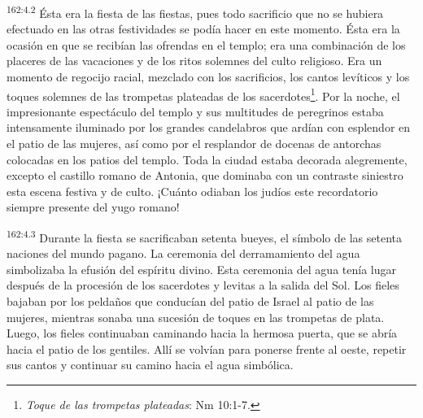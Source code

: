 \par
\textsuperscript{162:4.2} Ésta era la fiesta de las fiestas, pues todo sacrificio que no se hubiera efectuado en las otras festividades se podía hacer en este momento. Ésta era la ocasión en que se recibían las ofrendas en el templo; era una combinación de los placeres de las vacaciones y de los ritos solemnes del culto religioso. Era un momento de regocijo racial, mezclado con los sacrificios, los cantos levíticos y los toques solemnes de las trompetas plateadas de los sacerdotes\footnote{\textit{Toque de las trompetas plateadas}: Nm 10:1-7.}. Por la noche, el impresionante espectáculo del templo y sus multitudes de peregrinos estaba intensamente iluminado por los grandes candelabros que ardían con esplendor en el patio de las mujeres, así como por el resplandor de docenas de antorchas colocadas en los patios del templo. Toda la ciudad estaba decorada alegremente, excepto el castillo romano de Antonia, que dominaba con un contraste siniestro esta escena festiva y de culto. ¡Cuánto odiaban los judíos este recordatorio siempre presente del yugo romano!

\par
\textsuperscript{162:4.3} Durante la fiesta se sacrificaban setenta bueyes, el símbolo de las setenta naciones del mundo pagano. La ceremonia del derramamiento del agua simbolizaba la efusión del espíritu divino. Esta ceremonia del agua tenía lugar después de la procesión de los sacerdotes y levitas a la salida del Sol. Los fieles bajaban por los peldaños que conducían del patio de Israel al patio de las mujeres, mientras sonaba una sucesión de toques en las trompetas de plata. Luego, los fieles continuaban caminando hacia la hermosa puerta, que se abría hacia el patio de los gentiles. Allí se volvían para ponerse frente al oeste, repetir sus cantos y continuar su camino hacia el agua simbólica.

